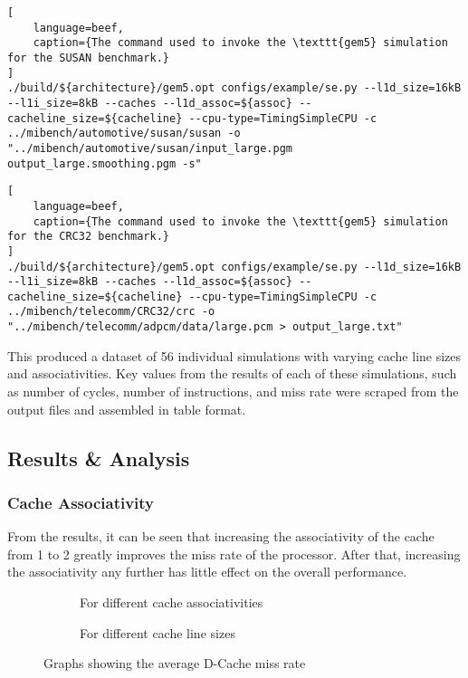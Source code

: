 \begin{lstlisting}[
    language=beef,
    caption={The command used to invoke the \texttt{gem5} simulation for the SUSAN benchmark.}
]
./build/${architecture}/gem5.opt configs/example/se.py --l1d_size=16kB --l1i_size=8kB --caches --l1d_assoc=${assoc} --cacheline_size=${cacheline} --cpu-type=TimingSimpleCPU -c ../mibench/automotive/susan/susan -o "../mibench/automotive/susan/input_large.pgm output_large.smoothing.pgm -s"
\end{lstlisting}

\begin{lstlisting}[
    language=beef,
    caption={The command used to invoke the \texttt{gem5} simulation for the CRC32 benchmark.}
]
./build/${architecture}/gem5.opt configs/example/se.py --l1d_size=16kB --l1i_size=8kB --caches --l1d_assoc=${assoc} --cacheline_size=${cacheline} --cpu-type=TimingSimpleCPU -c ../mibench/telecomm/CRC32/crc -o "../mibench/telecomm/adpcm/data/large.pcm > output_large.txt"
\end{lstlisting}

This produced a dataset of 56 individual simulations with varying cache line sizes and
associativities.
Key values from the results of each of these simulations, such as number of cycles,
number of instructions, and miss rate were scraped from the output files and assembled 
in table format.

\subsection{Results \& Analysis}

\subsubsection{Cache Associativity}

From the results, it can be seen that increasing the associativity of the cache from 
1 to 2 greatly improves the miss rate of the processor. After that, increasing the 
associativity any further has little effect on the overall performance.


\begin{figure}[H]%
\hfill%
\begin{subfigure}{.45\textwidth}
    \centering
    
    \caption{For different cache associativities}
    \label{fig:partb-assoc}
\end{subfigure}%
\hfill%
\begin{subfigure}{.45\textwidth}
    \centering
    
    \caption{For different cache line sizes}
    \label{fig:partb-cacheln}
\end{subfigure}%
\hfill\null%
\caption{Graphs showing the average D-Cache miss rate}
\label{fig:partb-avgs}
\end{figure}

